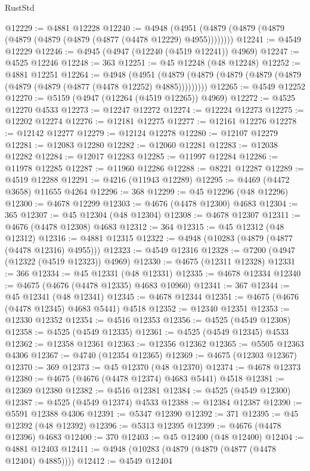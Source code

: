 \begin{lexlean}{RustStd}
\begin{coremodule}
@12229 := @4881 @12228
@12240 := @4948 (@4951 (@4879 (@4879 (@4879 (@4879 (@4879 (@4879 (@4877 (@4478 @12229) @4955))))))))
@12241 := @4549 @12229
@12246 := @4945 (@4947 (@12240 (@4519 @12241)) @4969)
@12247 := @4525 @12246
@12248 := 363
@12251 := @45 @12248 (@48 @12248)
@12252 := @4881 @12251
@12264 := @4948
    (@4951 (@4879 (@4879 (@4879 (@4879 (@4879 (@4879 (@4879 (@4877 (@4478 @12252) @4885)))))))))
@12265 := @4549 @12252
@12270 := @5159 (@4947 (@12264 (@4519 @12265)) @4969)
@12272 := @4525 @12270 @4533
@12273 := @12247 @12272
@12274 := @12224 @12273
@12275 := @12202 @12274
@12276 := @12181 @12275
@12277 := @12161 @12276
@12278 := @12142 @12277
@12279 := @12124 @12278
@12280 := @12107 @12279
@12281 := @12083 @12280
@12282 := @12060 @12281
@12283 := @12038 @12282
@12284 := @12017 @12283
@12285 := @11997 @12284
@12286 := @11978 @12285
@12287 := @11960 @12286
@12288 := @8221 @12287
@12289 := @4519 @12288
@12291 := @4216 (@11943 @12289)
@12295 := @4469 (@4472 @3658) @11655 @4264
@12296 := 368
@12299 := @45 @12296 (@48 @12296)
@12300 := @4678 @12299
@12303 := @4676 (@4478 @12300) @4683
@12304 := 365
@12307 := @45 @12304 (@48 @12304)
@12308 := @4678 @12307
@12311 := @4676 (@4478 @12308) @4683
@12312 := 364
@12315 := @45 @12312 (@48 @12312)
@12316 := @4881 @12315
@12322 := @4948 (@10283 (@4879 (@4877 (@4478 @12316) @4955)))
@12323 := @4549 @12316
@12328 := @7200 (@4947 (@12322 (@4519 @12323)) @4969)
@12330 := @4675 (@12311 @12328)
@12331 := 366
@12334 := @45 @12331 (@48 @12331)
@12335 := @4678 @12334
@12340 := @4675 (@4676 (@4478 @12335) @4683 @10960)
@12341 := 367
@12344 := @45 @12341 (@48 @12341)
@12345 := @4678 @12344
@12351 := @4675 (@4676 (@4478 @12345) @4683 @5441) @4518
@12352 := @12340 @12351
@12353 := @12330 @12352
@12354 := @4516 @12353
@12356 := @4525 (@4549 @12308)
@12358 := @4525 (@4549 @12335)
@12361 := @4525 (@4549 @12345) @4533
@12362 := @12358 @12361
@12363 := @12356 @12362
@12365 := @5505 @12363 @4306
@12367 := @4740 (@12354 @12365)
@12369 := @4675 (@12303 @12367)
@12370 := 369
@12373 := @45 @12370 (@48 @12370)
@12374 := @4678 @12373
@12380 := @4675 (@4676 (@4478 @12374) @4683 @5441) @4518
@12381 := @12369 @12380
@12382 := @4516 @12381
@12384 := @4525 (@4549 @12300)
@12387 := @4525 (@4549 @12374) @4533
@12388 := @12384 @12387
@12390 := @5591 @12388 @4306
@12391 := @5347 @12390
@12392 := 371
@12395 := @45 @12392 (@48 @12392)
@12396 := @5313 @12395
@12399 := @4676 (@4478 @12396) @4683
@12400 := 370
@12403 := @45 @12400 (@48 @12400)
@12404 := @4881 @12403
@12411 := @4948 (@10283 (@4879 (@4879 (@4877 (@4478 @12404) @4885))))
@12412 := @4549 @12404

\end{coremodule}
\end{lexlean}
